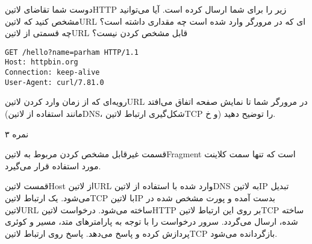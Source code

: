 \documentclass[../main.tex]{subfiles}
\begin{document}

دوست شما تقاضای ‌لاتین{HTTP} زیر را برای شما ارسال کرده است.
آیا می‌توانید مشخص کنید که ‌لاتین{URL} ای که در مرورگر وارد شده است چه مقداری داشته است؟
چه قسمتی از ‌لاتین{URL} قابل مشخص کردن نیست؟

\begin{latin}
\begin{verbatim}
GET /hello?name=parham HTTP/1.1
Host: httpbin.org
Connection: keep-alive
User-Agent: curl/7.81.0
\end{verbatim}
\end{latin}

رویه‌ای که از زمان وارد کردن ‌لاتین{URL} در مرورگر شما تا نمایش صفحه اتفاق می‌افتد (مانند استفاده از ‌لاتین{DNS}، شکل‌گیری ارتباط ‌لاتین{TCP} و ‌خ) را توضیح دهید.

۳ نمره


قسمت غیرقابل مشخص کردن مربوط به ‌لاتین{Fragment} است که تنها سمت کلاینت مورد استفاده قرار می‌گیرد.

 قمست ‌لاتین{Host} از ‌لاتین{URL} وارد شده با استفاده از ‌لاتین{DNS} به ‌لاتین{IP} تبدیل می‌شود.
 یک ارتباط ‌لاتین{TCP} با ‌لاتین{IP} بدست آمده و پورت مشخص شده در ‌لاتین{URL} ساخته می‌شود.
 درخواست ‌لاتین{HTTP} بر روی این ارتباط ‌لاتین{TCP} ساخته شده، ارسال می‌گردد.
 سرور درخواست را با توجه به پارامترهای متد، مسیر و کوئری پردازش کرده و پاسخ می‌دهد.
 پاسخ روی ارتباط ‌لاتین{TCP} بازگردانده می‌شود.

\end{document}
